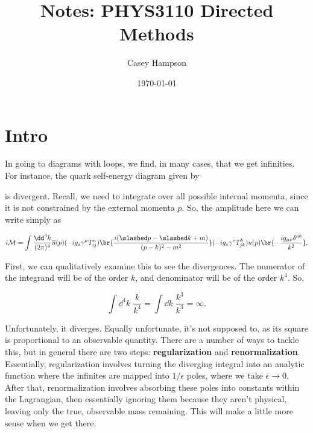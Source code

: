 \documentclass[titlepage]{article}
\title{Notes: PHYS3110 Directed Methods}
\author{Casey Hampson}
\date{\today}
\begin{document}
\maketitle
\pagebreak

\section{Intro}

In going to diagrams with loops, we find, in many cases, that we get infinities. For instance, the quark self-energy diagram given by

\begin{center}
\end{center}

is divergent. Recall, we need to integrate over all possible internal momenta, since it is not constrained by the external momenta $p$. So, the amplitude here we can write simply as

\begin{equation}
  i\mathcal{M} = \int \frac{\dd^4k}{(2\pi)^4} \overline{u}(p) (-ig_s\gamma^\mu T_{ij}^a) \br{\frac{i(\psl - \ksl + m)}{(p-k)^2 - m^2}} (-ig_s\gamma^\nu T_{jk}^b) u(p) \br{- \frac{ig_{\mu\nu}\delta^{ab}}{k^2}}.
\end{equation}

First, we can qualitatively examine this to see the divergences. The numerator of the integrand will be of the order $k$, and denominator will be of the order $k^4$. So,

\begin{equation}
  \label{eq:1}
  \int \dd^4k \; \frac{k}{k^4} = \int \dd k \; \frac{k^3}{k^3} = \infty.
\end{equation}

Unfortunately, it diverges. Equally unfortunate, it's not supposed to, as its square is proportional to an observable quantity. There are a number of ways to tackle this, but in general there are two steps: \textbf{regularization} and \textbf{renormalization}. Essentially, regularization involves turning the diverging integral into an analytic function where the infinites are mapped into $1/\epsilon$ poles, where we take $\epsilon \rightarrow 0$. After that, renormalization involves absorbing these poles into constants within the Lagrangian, then essentially ignoring them because they aren't physical, leaving only the true, observable mass remaining. This will make a little more sense when we get there.
\end{document}

